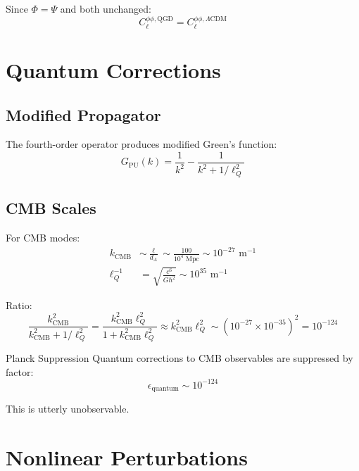 \documentclass[11pt,a4paper]{article}
\theoremstyle{definition}
\theoremstyle{remark}
\begin{document}
	Since $\Phi = \Psi$ and both unchanged:
	\begin{equation}
		\boxed{C_\ell^{\phi\phi, \text{QGD}} = C_\ell^{\phi\phi, \Lambda\text{CDM}}}
	\end{equation}
	
	\section{Quantum Corrections}
	
	\subsection{Modified Propagator}
	
	The fourth-order operator produces modified Green's function:
	\begin{equation}
		G_{\text{PU}}(k) = \frac{1}{k^2} - \frac{1}{k^2 + 1/\ell_Q^2}
	\end{equation}
	
	\subsection{CMB Scales}
	
	For CMB modes:
	\begin{align}
		k_{\text{CMB}} &\sim \frac{\ell}{d_A} \sim \frac{100}{10^4 \text{ Mpc}} \sim 10^{-27} \text{ m}^{-1}\\
		\ell_Q^{-1} &= \sqrt{\frac{c^6}{G\hbar^2}} \sim 10^{35} \text{ m}^{-1}
	\end{align}
	
	Ratio:
	\begin{equation}
		\frac{k_{\text{CMB}}^2}{k_{\text{CMB}}^2 + 1/\ell_Q^2} = \frac{k_{\text{CMB}}^2\ell_Q^2}{1 + k_{\text{CMB}}^2\ell_Q^2} \approx k_{\text{CMB}}^2\ell_Q^2 \sim (10^{-27} \times 10^{-35})^2 = 10^{-124}
	\end{equation}
	
	Planck Suppression
		Quantum corrections to CMB observables are suppressed by factor:
		\begin{equation}
			\boxed{\epsilon_{\text{quantum}} \sim 10^{-124}}
		\end{equation}
		
		This is utterly unobservable.
	
	\section{Nonlinear Perturbations}
	
\end{document}

